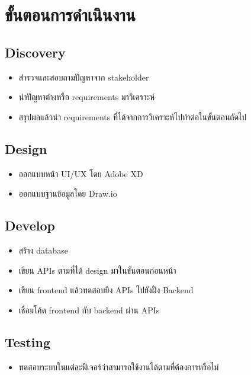 \section{ขั้นตอนการดำเนินงาน}
\subsection{Discovery}
\begin{itemize}
  \item สำรวจและสอบถามปัญหาจาก stakeholder
  \item นำปัญหาต่างหรือ requirements มาวิเคราะห์
  \item สรุปผลแล้วนำ requirements ที่ได้จากการวิเคราะห์ไปทำต่อในขั้นตอนถัดไป
\end{itemize}

\subsection{Design}
\begin{itemize}
  \item ออกแบบหน้า UI/UX โดย Adobe XD
  \item ออกแบบฐานข้อมูลโดย Draw.io
\end{itemize}

\subsection{Develop}
\begin{itemize}
  \item สร้าง database
  \item เขียน APIs ตามที่ได้ design มาในขั้นตอนก่อนหน้า
  \item เขียน frontend แล้วทดสอบยิง APIs ไปยังฝั่ง Backend
  \item เชื่อมโค้ด frontend กับ backend ผ่าน APIs
\end{itemize}

\subsection{Testing}
\begin{itemize}
  \item ทดสอบระบบในแต่ละฟีเจอร์ว่าสามารถใช้งานได้ตามที่ต้องการหรือไม่
\end{itemize}



